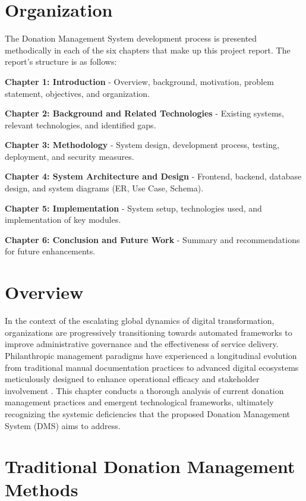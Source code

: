 \newpage
\section{Organization}

The Donation Management System development process is presented methodically in each of the six chapters that make up this project report. The report's structure is as follows:

\textbf{Chapter 1: Introduction} - Overview, background, motivation, problem statement, objectives, and organization.

\textbf{Chapter 2: Background and Related Technologies} - Existing systems, relevant technologies, and identified gaps.

\textbf{Chapter 3: Methodology} - System design, development process, testing, deployment, and security measures.

\textbf{Chapter 4: System Architecture and Design} - Frontend, backend, database design, and system diagrams (ER, Use Case, Schema).

\textbf{Chapter 5: Implementation} - System setup, technologies used, and implementation of key modules.

\textbf{Chapter 6: Conclusion and Future Work} - Summary and recommendations for future enhancements.


\section{Overview} In the context of the escalating global dynamics of digital transformation, organizations are progressively transitioning towards automated frameworks to improve administrative governance and the effectiveness of service delivery. Philanthropic management paradigms have experienced a longitudinal evolution from traditional manual documentation practices to advanced digital ecosystems meticulously designed to enhance operational efficacy and stakeholder involvement \cite{sander2021digital}. This chapter conducts a thorough analysis of current donation management practices and emergent technological frameworks, ultimately recognizing the systemic deficiencies that the proposed Donation Management System (DMS) aims to address.

\section{Traditional Donation Management Methods}


